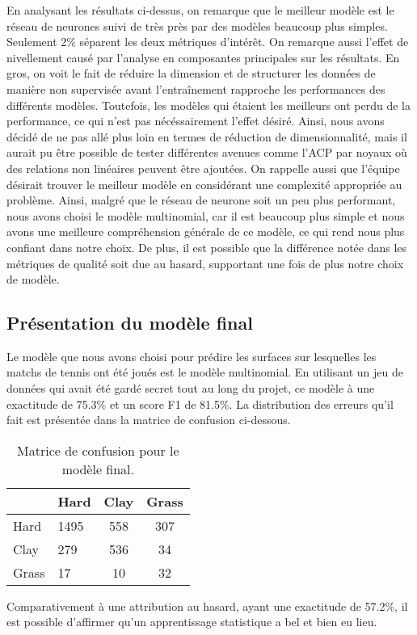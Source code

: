 En analysant les résultats ci-dessus, on remarque que le meilleur modèle est le réseau de neurones suivi de très près par des modèles beaucoup plus simples. Seulement 2\% séparent les deux métriques d'intérêt. On remarque aussi l'effet de nivellement causé par l'analyse en composantes principales sur les résultats. En gros, on voit le fait de réduire la dimension et de structurer les données de manière non supervisée avant l'entraînement rapproche les performances des différents modèles. Toutefois, les modèles qui étaient les meilleurs ont perdu de la performance, ce qui n'est pas nécéssairement l'effet désiré. Ainsi, nous avons décidé de ne pas allé plus loin en termes de réduction de dimensionnalité, mais il aurait pu être possible de tester différentes avenues comme l'ACP par noyaux où des relations non linéaires peuvent être ajoutées. On rappelle aussi que l'équipe désirait trouver le meilleur modèle en considérant une complexité appropriée au problème. Ainsi, malgré que le réseau de neurone soit un peu plus performant, nous avons choisi le modèle multinomial, car il est beaucoup plus simple et nous avons une meilleure compréhension générale de ce modèle, ce qui rend nous plus confiant dans notre choix. De plus, il est possible que la différence notée dans les métriques de qualité soit due au hasard, supportant une fois de plus notre choix de modèle. 
 
\subsection{Présentation du modèle final}
Le modèle que nous avons choisi pour prédire les surfaces sur lesquelles les matchs de tennis ont été joués est le modèle multinomial. En utilisant un jeu de données qui avait été gardé secret tout au long du projet, ce modèle à une exactitude de 75.3\% et un score F1 de 81.5\%. La distribution des erreurs qu'il fait est présentée dans la matrice de confusion ci-dessous.

\begin{table}[H]
	
	\caption{\label{tab:matrice_confusion}Matrice de confusion pour le modèle final.}
	\centering
	\begin{tabular}[t]{llcc}
		\hiderowcolors
		\toprule
		& Hard & Clay & Grass\\
		\midrule
		\showrowcolors
		Hard & 1495 & 558 & 307\\
		Clay & 279 & 536 & 34\\
		Grass & 17 & 10 & 32\\
		\bottomrule
	\end{tabular}
\end{table}

Comparativement à une attribution au hasard, ayant une exactitude de 57.2\%, il est possible d'affirmer qu'un apprentissage statistique a bel et bien eu lieu. 
